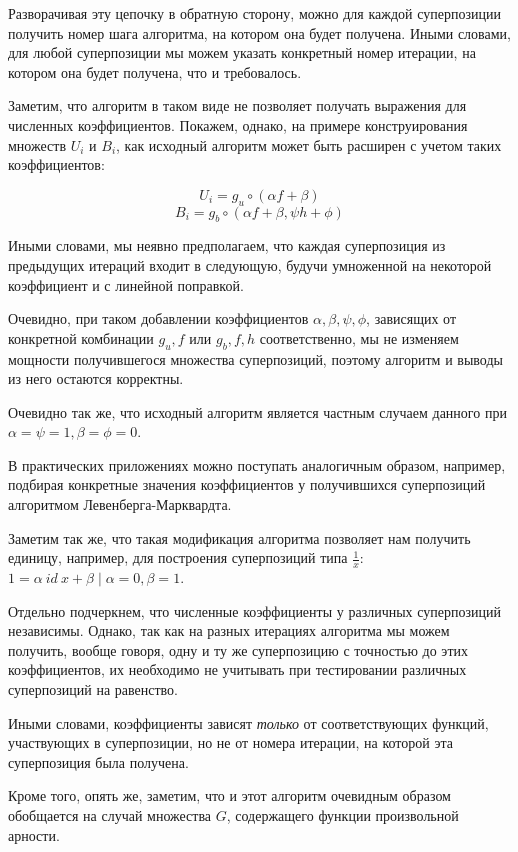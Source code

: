 \documentclass[12pt,a4paper]{amsart}
\begin{document}
Разворачивая эту цепочку в обратную сторону, можно для каждой суперпозиции
получить номер шага алгоритма, на котором она будет получена. Иными словами,
для любой суперпозиции мы можем указать конкретный номер итерации, на
котором она будет получена, что и требовалось.

Заметим, что алгоритм в таком виде не позволяет получать выражения для
численных коэффициентов. Покажем, однако, на примере конструирования
множеств $U_i$ и $B_i$, как исходный алгоритм может быть расширен с учетом
таких коэффициентов:

\[
U_i = { g_u \circ (\alpha f + \beta) }
\]
\[
B_i = { g_b \circ (\alpha f + \beta, \psi h + \phi) }
\]

Иными словами, мы неявно предполагаем, что каждая суперпозиция из предыдущих
итераций входит в следующую, будучи умноженной на некоторой коэффициент и с
линейной поправкой.

Очевидно, при таком добавлении коэффициентов $\alpha, \beta, \psi, \phi$,
зависящих от конкретной комбинации $g_u, f$ или $g_b, f, h$ соответственно,
мы не изменяем мощности получившегося множества суперпозиций, поэтому
алгоритм и выводы из него остаются корректны.

Очевидно так же, что исходный алгоритм является частным случаем данного при
$\alpha = \psi = 1, \beta = \phi = 0$.

В практических приложениях можно поступать аналогичным образом, например,
подбирая конкретные значения коэффициентов у получившихся суперпозиций
алгоритмом Левенберга-Марквардта.

Заметим так же, что такая модификация алгоритма позволяет нам получить единицу,
например, для построения суперпозиций типа $\frac{1}{x}$:
$1 = \alpha\ id\ x + \beta \mid \alpha = 0, \beta = 1$.

Отдельно подчеркнем, что численные коэффициенты у различных суперпозиций
независимы. Однако, так как на разных итерациях алгоритма мы можем получить,
вообще говоря, одну и ту же суперпозицию с точностью до этих коэффициентов,
их необходимо не учитывать при тестировании различных суперпозиций на
равенство.

Иными словами, коэффициенты зависят \emph{только} от соответствующих функций,
участвующих в суперпозиции, но не от номера итерации, на которой эта
суперпозиция была получена.

Кроме того, опять же, заметим, что и этот алгоритм очевидным образом
обобщается на случай множества $G$, содержащего функции произвольной арности.
\end{document}
